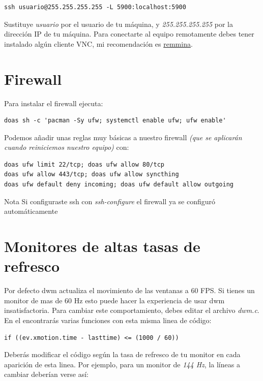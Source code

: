 \documentclass[11pt]{article}
\begin{document}
\begin{verbatim}
ssh usuario@255.255.255.255 -L 5900:localhost:5900
\end{verbatim}

Sustituye \emph{usuario} por el usuario de tu máquina, y \emph{255.255.255.255} por la dirección IP de tu máquina. Para conectarte al equipo remotamente debes tener instalado algún cliente VNC, mi recomendación es \href{https://github.com/FreeRDP/Remmina}{remmina}.

\section{Firewall}

Para instalar el firewall ejecuta:

\begin{verbatim}
doas sh -c 'pacman -Sy ufw; systemctl enable ufw; ufw enable'
\end{verbatim}

Podemos añadir unas reglas muy básicas a nuestro firewall \emph{(que se aplicarán cuando reiniciemos nuestro equipo)} con:

\begin{verbatim}
doas ufw limit 22/tcp; doas ufw allow 80/tcp
doas ufw allow 443/tcp; doas ufw allow syncthing
doas ufw default deny incoming; doas ufw default allow outgoing
\end{verbatim}

\begin{mybox}{Nota}
	Si configuraste ssh con \emph{ssh-configure} el firewall ya se configuró automáticamente
\end{mybox}

\section{Monitores de altas tasas de refresco}

Por defecto dwm actualiza el movimiento de las ventanas a 60 FPS. Si tienes un monitor de mas de 60 Hz esto puede hacer la experiencia de usar dwm insatisfactoria. Para cambiar este comportamiento, debes editar el archivo \emph{dwm.c}. En el encontrarás varias funciones con esta misma linea de código:

\begin{verbatim}
if ((ev.xmotion.time - lasttime) <= (1000 / 60))
\end{verbatim}

Deberás modificar el código según la tasa de refresco de tu monitor en cada aparición de esta linea. Por ejemplo, para un monitor de \emph{144 Hz}, la líneas a cambiar deberían verse así:
\end{document}
